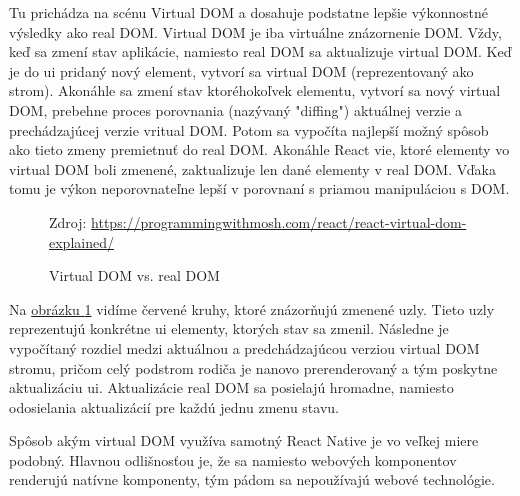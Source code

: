 Tu prichádza na scénu Virtual DOM a dosahuje podstatne lepšie výkonnostné výsledky ako real DOM. Virtual DOM je iba virtuálne znázornenie DOM. Vždy, keď sa zmení stav aplikácie, namiesto real DOM sa aktualizuje virtual DOM. Keď je do \acrshort{ui} pridaný nový element, vytvorí sa virtual DOM (reprezentovaný ako strom). Akonáhle sa zmení stav ktoréhokoľvek elementu, vytvorí sa nový virtual DOM, prebehne proces porovnania (nazývaný "diffing") aktuálnej verzie a prechádzajúcej verzie vritual DOM. Potom sa vypočíta najlepší možný spôsob ako tieto zmeny premietnuť do real DOM. Akonáhle React vie, ktoré elementy vo virtual DOM boli zmenené, zaktualizuje len dané elementy v real DOM. Vďaka tomu je výkon neporovnateľne lepší v porovnaní s priamou manipuláciou s DOM. \cite{rn4}

\begin{figure}[!htbp]
  \centering  
  \def\stackalignment{c}
           {\scriptsize%
            Zdroj: \url{https://programmingwithmosh.com/react/react-virtual-dom-explained/}}
	\caption{Virtual DOM vs. real DOM}  
  \label{domImg}
\end{figure}
Na \hyperref[domImg]{obrázku \ref{domImg}} vidíme červené kruhy, ktoré znázorňujú zmenené uzly. Tieto uzly reprezentujú konkrétne \acrshort{ui} elementy, ktorých stav sa zmenil. Následne je vypočítaný rozdiel medzi aktuálnou a predchádzajúcou verziou virtual DOM stromu, pričom celý podstrom rodiča je nanovo prerenderovaný a tým poskytne aktualizáciu \acrshort{ui}. Aktualizácie real DOM sa posielajú hromadne, namiesto odosielania aktualizácií pre každú jednu zmenu stavu.

Spôsob akým virtual DOM využíva samotný React Native je vo veľkej miere podobný. Hlavnou odlišnosťou je, že sa namiesto webových komponentov renderujú natívne komponenty, tým pádom sa nepoužívajú webové technológie. \\

